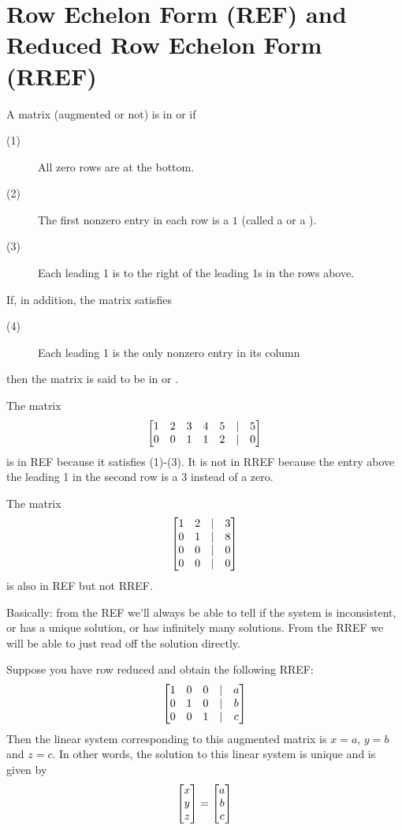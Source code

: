 \section[REF and RREF]{Row Echelon Form (REF) and Reduced Row Echelon Form (RREF)}

 

\begin{definition}
A matrix (augmented or not) is in  or  if
\begin{description}
\item[(1)] All zero rows are at the bottom.
\item[(2)] The first nonzero entry in each row is a $1$ (called a  or a ).
\item[(3)] Each leading 1 is to the right of the leading 1s in the rows above.
\end{description}
If, in addition, the matrix satisfies
\begin{description}
\item[(4)] Each leading 1 is the only nonzero entry in its column
\end{description}
then the matrix is said to be in  or .
\end{definition}

\begin{myexample} The matrix
$$
\left[ \begin{matrix} 1 & 2 & 3 & 4 & 5 &| & 5\\
0 & 0 & 1 & 1 & 2 & | & 0
 \end{matrix} \right]
$$
is in REF because it satisfies (1)-(3).  It is not in RREF because the
entry above the leading 1 in the second row is a 3 instead of a zero.
\end{myexample}

\begin{myexample} The matrix
$$
\left[ \begin{matrix} 1 & 2 & | & 3\\
0 & 1 & | & 8 \\
0 & 0 & | & 0 \\
0 & 0 & | & 0 \end{matrix} \right]
$$
is also in REF but not RREF. \end{myexample}

Basically:  from the REF we'll always be able to tell if the system is inconsistent, or has a unique solution, or has infinitely many solutions.  From the RREF
we will be able to just read off the solution directly.



\begin{myexample} \label{ex:uniquesol} Suppose you have row reduced and obtain the following RREF:
$$
\left[ \begin{matrix} 1 & 0 & 0 &|& a\\
0 & 1 & 0 & | & b\\
0 & 0 & 1 & | & c \end{matrix} \right]
$$
Then the linear system corresponding to this augmented matrix is
$x=a$, $y=b$ and $z=c$.  In other words, the solution to this
linear system is unique and is given by
$$
\left[ \begin{matrix} x\\y\\z \end{matrix} \right] = \left[ \begin{matrix} a\\b\\c \end{matrix} \right]
$$
\end{myexample}

